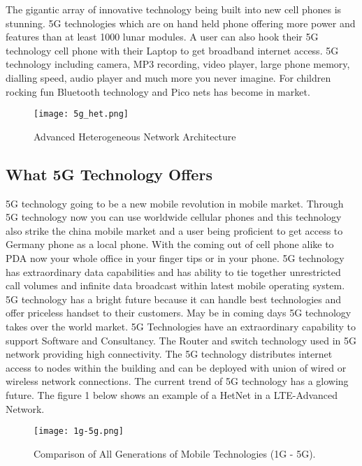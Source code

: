 \documentclass[conference]{IEEEtran}
\begin{document}
\par
The gigantic array of innovative technology being built into new cell phones is stunning. 5G technologies which are on hand held phone offering more power and features than at least 1000 lunar modules. A user can also hook their 5G technology cell phone with their Laptop to get broadband internet access. 5G technology including camera, MP3 recording, video player, large phone memory, dialling speed, audio player and much more you never imagine. For children rocking fun Bluetooth technology and Pico nets has become in market.
\begin{figure*}[tb]
  \caption{Advanced Heterogeneous Network Architecture}
  \centering
    \texttt{[image: 5g\_het.png]}
\end{figure*}

\subsection{What 5G Technology Offers}
5G technology going to be a new mobile revolution in mobile market. Through 5G technology now you can use worldwide cellular phones and this technology also strike the china mobile market and a user being proficient to get access to Germany phone as a local phone. With the coming out of cell phone alike to PDA now your whole office in your finger tips or in your phone. 5G technology has extraordinary data capabilities and has ability to tie together unrestricted call volumes and infinite data broadcast within latest mobile operating system. 5G technology has a bright future because it can handle best technologies and offer priceless handset to their customers. May be in coming days 5G technology takes over the world market. 5G Technologies have an extraordinary capability to support Software and Consultancy. The Router and switch technology used in 5G network providing high connectivity. The 5G technology distributes internet access to nodes within the building and can be deployed with union of wired or wireless network connections. The current trend of 5G technology has a glowing future. The figure 1 below shows an example of a HetNet in a LTE-Advanced Network.
\begin{figure*}[tb]
  \caption{Comparison of All Generations of Mobile Technologies (1G - 5G).}
  \centering
    \texttt{[image: 1g-5g.png]}
\end{figure*}
\end{document}
